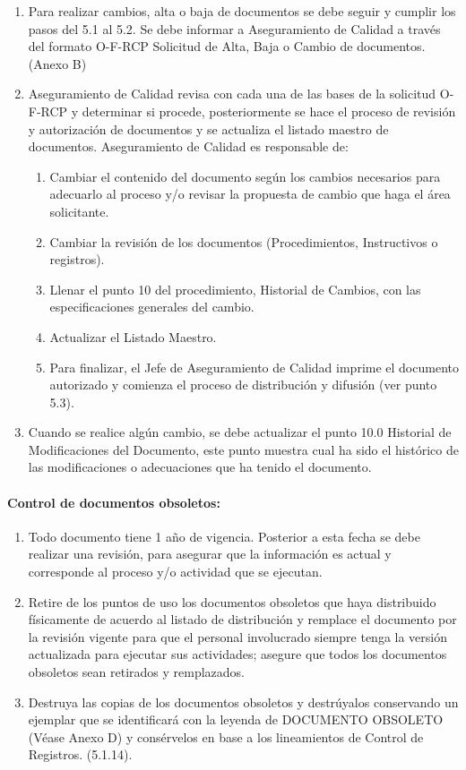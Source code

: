 \begin{enumerate}
	\item Para realizar cambios, alta o baja de documentos se debe seguir y cumplir los pasos del 5.1 al 5.2. Se debe informar a Aseguramiento de Calidad a través del formato O-F-RCP Solicitud de Alta, Baja o Cambio de documentos. (Anexo B)
	\item Aseguramiento de Calidad revisa con cada una de las bases de la solicitud O-F-RCP y determinar si procede, posteriormente se hace el proceso de revisión y autorización de documentos y se actualiza el listado maestro de documentos. Aseguramiento de Calidad es responsable de:
	\begin{enumerate}
		\item Cambiar el contenido del documento según los cambios necesarios para adecuarlo al proceso y/o revisar la propuesta de cambio que haga el área solicitante.
		\item Cambiar la revisión de los documentos (Procedimientos, Instructivos o registros).
		\item Llenar el punto 10 del procedimiento, Historial de Cambios, con las especificaciones generales del cambio.
		\item Actualizar el Listado Maestro.
		\item Para finalizar, el Jefe de Aseguramiento de Calidad imprime el documento autorizado y comienza el proceso de distribución y difusión (ver punto 5.3).
	\end{enumerate}
	\item Cuando se realice algún cambio, se debe actualizar el punto 10.0 Historial de Modificaciones del Documento, este punto muestra cual ha sido el histórico de las modificaciones o adecuaciones que ha tenido el documento.
\end{enumerate}

\paragraph{Control de documentos obsoletos:}

\begin{enumerate}
	\item Todo documento tiene 1 año de vigencia. Posterior a esta fecha se debe realizar una revisión, para asegurar que la información es actual y corresponde al proceso y/o actividad que se ejecutan.
	\item Retire de los puntos de uso los documentos obsoletos que haya distribuido físicamente de acuerdo al listado de distribución y remplace el documento por la revisión vigente para que el personal involucrado siempre tenga la versión actualizada para ejecutar sus actividades; asegure que todos los documentos obsoletos sean retirados y remplazados.
	\item Destruya las copias de los documentos obsoletos y destrúyalos conservando un ejemplar que se identificará con la leyenda de DOCUMENTO OBSOLETO (Véase Anexo D) y consérvelos en base a los lineamientos de Control de Registros. (5.1.14).
\end{enumerate}

